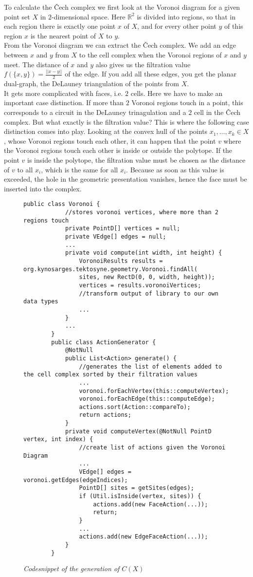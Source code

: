 \documentclass[11pt, a4paper,draft]{report}
\newcommand{\bR}{\mathbb{R}}
\begin{document}
	To calculate the Čech complex we first look at the Voronoi diagram for a given point set $X$ in $2$-dimensional space. Here $\bR^2$ is divided into regions, so that in each region there is exactly one point $x$ of $X$, and for every other point $y$ of this region $x$ is the nearest point of $X$ to $y$.\\
From the Voronoi diagram we can extract the Čech complex. We add an edge between $x$ and $y$ from $X$ to the cell complex when the Voronoi regions of $x$ and $y$ meet. The distance of $x$ and $y$ also gives us the filtration value $f(\{x,y\}) = \frac{||x-y||}{2}$ of the edge. If you add all these edges, you get the planar dual-graph, the DeLauney triangulation of the points from $X$.\\
It gets more complicated with faces, i.e. $2$ cells. Here we have to make an important case distinction. If more than $2$ Voronoi regions touch in a point, this corresponds to a circuit in the DeLauney trinagulation and a $2$ cell in the Čech complex. But what exactly is the filtration value? This is where the following case distinction comes into play. Looking at the convex hull of the points $x_1,\ldots,x_k\in X$, whose Voronoi regions touch each other, it can happen that the point $v$ where the Voronoi regions touch each other is inside or outside the polytope. If the point $v$ is inside the polytope, the filtration value must be chosen as the distance of $v$ to all $x_i$, which is the same for all $x_i$. Because as soon as this value is exceeded, the hole in the geometric presentation vanishes, hence the face must be inserted into the complex.\\
 	\lstset{language=Java}
 	\begin{figure}
 		\begin{lstlisting}[frame=single]
 		public class Voronoi {
	 		//stores voronoi vertices, where more than 2 regions touch
	 		private PointD[] vertices = null;
	 		private VEdge[] edges = null;
	 		...
	 		private void compute(int width, int height) {
		 		VoronoiResults results = org.kynosarges.tektosyne.geometry.Voronoi.findAll(
		 		sites, new RectD(0, 0, width, height));
		 		vertices = results.voronoiVertices;
		 		//transform output of library to our own data types
		 		...
	 		}
	 		...
 		}
 		public class ActionGenerator {
	 		@NotNull
	 		public List<Action> generate() {
		 		//generates the list of elements added to the cell complex sorted by their filtration values
		 		...
		 		voronoi.forEachVertex(this::computeVertex);
		 		voronoi.forEachEdge(this::computeEdge);
		 		actions.sort(Action::compareTo);
		 		return actions;
		 	}
		 	private void computeVertex(@NotNull PointD vertex, int index) {
		 		//create list of actions given the Voronoi Diagram
		 		...
		 		VEdge[] edges = voronoi.getEdges(edgeIndices);
		 		PointD[] sites = getSites(edges);
		 		if (Util.isInside(vertex, sites)) {
		 			actions.add(new FaceAction(...));
		 			return;
		 		}
		 		...
		 		actions.add(new EdgeFaceAction(...));
	 		}
 		}
 		\end{lstlisting}
 		\caption{\textit{Codesnippet of the generation of $C(X)$}}
 		\label{fig3}
 	\end{figure}
\end{document}
